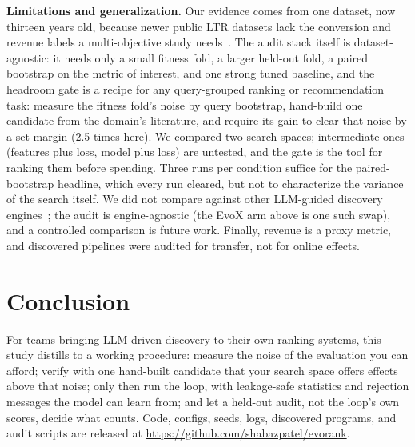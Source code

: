 \documentclass[]{ceurart}
\begin{document}
\textbf{Limitations and generalization.} Our evidence comes from one
dataset, now thirteen years old, because newer public LTR datasets lack the
conversion and revenue labels a multi-objective study needs~\cite{survey2024}.
The audit stack itself is dataset-agnostic: it needs only a small fitness
fold, a larger held-out fold, a paired bootstrap on the metric of interest,
and one strong tuned baseline, and the headroom gate is a recipe for any
query-grouped ranking or recommendation task: measure the fitness fold's
noise by query bootstrap, hand-build one candidate from the domain's
literature, and require its gain to clear that noise by a set margin (2.5
times here). We compared two search spaces; intermediate ones (features
plus loss, model plus loss) are untested, and the gate is the tool for
ranking them before spending. Three runs per condition suffice for the
paired-bootstrap headline, which every run cleared, but not to
characterize the variance of the search itself. We did not compare against other LLM-guided discovery
engines~\cite{alphaevolve,gepa}; the audit is engine-agnostic (the EvoX arm
above is one such swap), and a controlled comparison is future work.
Finally, revenue is a proxy metric, and discovered pipelines were audited
for transfer, not for online effects.

\section{Conclusion}
For teams bringing LLM-driven discovery to their own ranking systems, this
study distills to a working procedure: measure the noise of the evaluation
you can afford; verify with one hand-built candidate that your search space
offers effects above that noise; only then run the loop, with leakage-safe
statistics and rejection messages the model can learn from; and let a
held-out audit, not the loop's own scores, decide what counts. Code, configs, seeds,
logs, discovered programs, and audit scripts are released at
\url{https://github.com/shabazpatel/evorank}.
\end{document}

